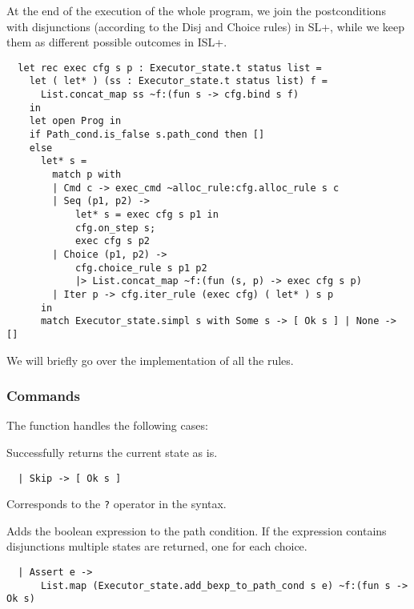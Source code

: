 \documentclass[parskip=half]{scrartcl}
\begin{document}
At the end of the execution of the whole program, we join the postconditions with disjunctions (according to the Disj and Choice rules) in SL+, while we keep them as different possible outcomes in ISL+.

\begin{verbatim}
  let rec exec cfg s p : Executor_state.t status list =
    let ( let* ) (ss : Executor_state.t status list) f =
      List.concat_map ss ~f:(fun s -> cfg.bind s f)
    in
    let open Prog in
    if Path_cond.is_false s.path_cond then []
    else
      let* s =
        match p with
        | Cmd c -> exec_cmd ~alloc_rule:cfg.alloc_rule s c
        | Seq (p1, p2) ->
            let* s = exec cfg s p1 in
            cfg.on_step s;
            exec cfg s p2
        | Choice (p1, p2) ->
            cfg.choice_rule s p1 p2
            |> List.concat_map ~f:(fun (s, p) -> exec cfg s p)
        | Iter p -> cfg.iter_rule (exec cfg) ( let* ) s p
      in
      match Executor_state.simpl s with Some s -> [ Ok s ] | None -> []
\end{verbatim}

We will briefly go over the implementation of all the rules.

\subsubsection{Commands}

The  function handles the following cases:


Successfully returns the current state as is.

\begin{verbatim}
  | Skip -> [ Ok s ]
\end{verbatim}


Corresponds to the \texttt{?} operator in the syntax.

Adds the boolean expression to the path condition. If the expression contains disjunctions multiple states are returned, one for each choice.

\begin{verbatim}
  | Assert e ->
      List.map (Executor_state.add_bexp_to_path_cond s e) ~f:(fun s -> Ok s)
\end{verbatim}

\end{document}
